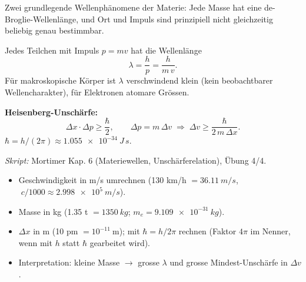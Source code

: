 

Zwei grundlegende Wellenphänomene der Materie: Jede Masse hat eine
de-Broglie-Wellenlänge, und Ort und Impuls sind prinzipiell nicht gleichzeitig
beliebig genau bestimmbar.

\begin{werkzeugkasten}
Jedes Teilchen mit Impuls $p = m v$ hat die Wellenlänge
\begin{equation}
  \lambda = \frac{h}{p} = \frac{h}{m\,v}.
\end{equation}
Für makroskopische Körper ist $\lambda$ verschwindend klein (kein
beobachtbarer Wellencharakter), für Elektronen atomare Grössen.

\textbf{Heisenberg-Unschärfe:}
\begin{equation}
  \Delta x \cdot \Delta p \ge \frac{\hbar}{2},
  \qquad \Delta p = m\,\Delta v
  \;\Longrightarrow\;
  \Delta v \ge \frac{\hbar}{2\,m\,\Delta x}.
\end{equation}
$\hbar = h/(2\pi) \approx \qty{1.055e-34}{J\,s}$.

\textit{Skript:} Mortimer Kap. 6 (Materiewellen, Unschärferelation),
Übung 4/4.
\end{werkzeugkasten}

\begin{achtung}
\begin{itemize}
  \item Geschwindigkeit in m/s umrechnen (130 km/h $=\qty{36.11}{m/s}$,
        $\;c/1000 \approx \qty{2.998e5}{m/s}$).
  \item Masse in kg (1.35 t $= \qty{1350}{kg}$; $m_e = \qty{9.109e-31}{kg}$).
  \item $\Delta x$ in m (10 pm $= 10^{-11}\ \mathrm{m}$); mit $\hbar=h/2\pi$
        rechnen (Faktor $4\pi$ im Nenner, wenn mit $h$ statt $\hbar$
        gearbeitet wird).
  \item Interpretation: kleine Masse $\to$ grosse $\lambda$ und grosse
        Mindest-Unschärfe in $\Delta v$.
\end{itemize}
\end{achtung}
